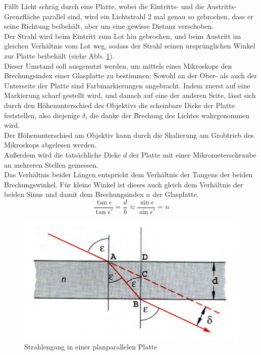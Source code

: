 \documentclass[12pt,a4paper]{article}
\begin{document}
\begin{multicols}{2}
Fällt Licht schräg durch eine Platte, wobei die Eintritts- und die Austritts-Grenzfläche parallel sind, wird ein Lichtstrahl 2 mal genau so gebrochen, dass er seine Richtung beibehält, aber um eine gewisse Distanz verschoben.\\
Der Strahl wird beim Eintritt zum Lot hin gebrochen, und beim Austritt im gleichen Verhältnis vom Lot weg, sodass der Strahl seinen ursprünglichen Winkel zur Platte beibehält (siehe Abb. \ref{fig:planparallele_Skizze}).\\
Dieser Umstand soll ausgenutzt werden, um mittels eines Mikroskops den Brechungsindex einer Glasplatte zu bestimmen: Sowohl an der Ober- als auch der Unterseite  der Platte sind Farbmarkierungen angebracht. Indem zuerst auf eine Markierung scharf gestellt wird, und danach auf eine der anderen Seite, lässt sich durch den Höhenunterschied des Objektivs die scheinbare Dicke der Platte feststellen, also diejenige $\delta$, die danke der Brechung des Lichtes wahrgenommen wird.\\
Der Höhenunterschied am Objektiv kann durch die Skalierung am Grobtrieb des Mikroskops abgelesen werden.\\
Außerdem wird die tatsächliche Dicke $d$ der Platte mit einer Mikrometerschraube an mehreren Stellen gemessen.\\
Das Verhältnis beider Längen entspricht dem Verhältnis der Tangens der beiden Brechungswinkel. Für kleine Winkel ist dieses auch gleich dem Verhältnis der beiden Sinus und damit dem Brechungsindex $n$ der Glasplatte.
$$\frac{\tan{\epsilon}}{\tan{\epsilon '}}=\frac{d}{b}\approx \frac{\sin{\epsilon}}{\sin{\epsilon '}}=n$$


\begin{figure}[H]
	\centering
	\includegraphics[scale=0.65]{./figure/planparallele_Skizze.png}
	\caption{Strahlengang in einer planparallelen Platte}
	\label{fig:planparallele_Skizze}
\end{figure}



\end{multicols}
\end{document}
